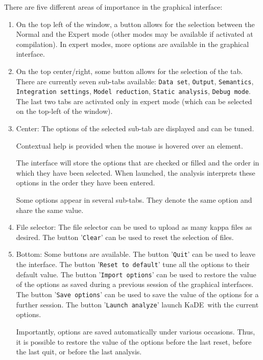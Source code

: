 \documentclass[11pt]{book}
\def\KaDE{\textsf{KaDE}}
\begin{document}
There are five different areas of importance in the graphical interface:
\begin{enumerate}
\item On the top left of the window, a button allows for the selection between the Normal and the Expert mode (other modes may be available if activated at compilation).
In expert modes, more options are available in the graphical interface.
\item On the top center/right, some button allows for the selection of the tab. There are currently seven sub-tabs available: \texttt{Data set}, \texttt{Output}, \texttt{Semantics}, \texttt{Integration settings}, \texttt{Model reduction}, \texttt{Static analysis}, \texttt{Debug mode}. The last two tabs are activated only in expert mode (which can be selected on the top-left of the window).

\item Center: The options of the selected sub-tab are displayed and can be tuned.

Contextual help is provided when the mouse is hovered over an element.

The interface will store the options that are checked or filled and the order in which they have been selected.
When launched, the analysis interprets these options in the order they have been entered.

Some options appear in several sub-tabs. They denote the same option and share the same value.

\item File selector: The file selector can be used to upload as many kappa files as desired. The button '\texttt{Clear}' can be used to reset the selection of files.
\item Bottom: Some buttons are available. The button '\texttt{Quit}' can be used to leave the interface. The button '\texttt{Reset to default}' tune all the options to their default value. The button '\texttt{Import options}' can be used to restore the value of the options as saved during a previous session of the graphical interfaces. The button '\texttt{Save options}' can be used to save the value of the options for a further session. The button '\texttt{Launch analyze}' launch \KaDE\ with the current options.

Importantly, options are saved automatically under various occasions. Thus, it is possible to restore the value of the options
before the last reset, before the last quit, or before the last analysis.
\end{enumerate}
\end{document}
